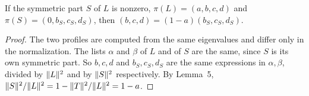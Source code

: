 \begin{lemma}
\label{lem:profile-scale}
\leanok
{}
If the symmetric part $S$ of $L$ is nonzero, $\pi(L)=(a,b,c,d)$ and
$\pi(S)=(0,b_S,c_S,d_S)$, then $(b,c,d)=(1-a)(b_S,c_S,d_S)$.
\end{lemma}
\begin{proof}
\leanok
{}
The two profiles are computed from the same eigenvalues and differ only in
the normalization. The lists $\alpha$ and $\beta$ of $L$ and of $S$ are
the same, since $S$ is its own symmetric part. So $b,c,d$ and
$b_S,c_S,d_S$ are the same expressions in $\alpha,\beta$, divided by
$\lVert L\rVert^2$ and by $\lVert S\rVert^2$ respectively. By Lemma~5,
$\lVert S\rVert^2/\lVert L\rVert^2=1-\lVert T\rVert^2/\lVert L\rVert^2=1-a$.
\end{proof}

